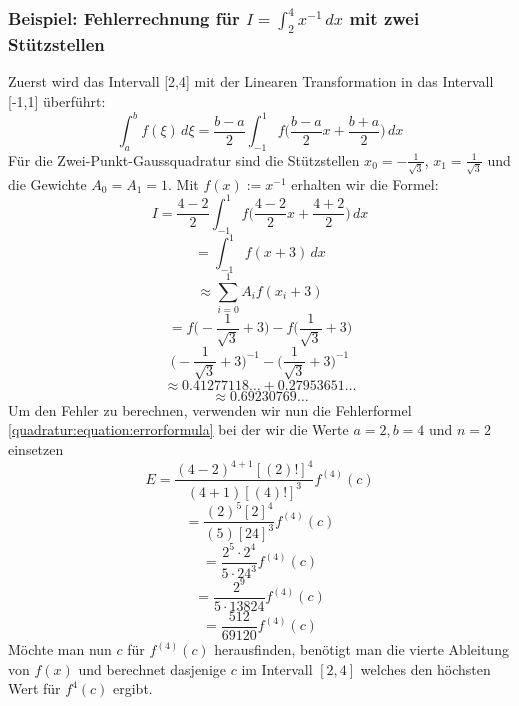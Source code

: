 \subsubsection{Beispiel: Fehlerrechnung für $I = \int_{2}^{4}x^{-1}\,dx$ mit zwei Stützstellen}
Zuerst wird das Intervall [2,4] mit der Linearen Transformation in das Intervall [-1,1] überführt:
\begin{equation}
    \int_{a}^{b} f(\xi)\,d\xi = \frac{b-a}{2}\int_{-1}^{1} f \bigg( \frac{b-a}{2} x + \frac{b+a}{2} \bigg) \,dx
\end{equation}
Für die Zwei-Punkt-Gaussquadratur sind die Stützstellen 
$x_{0}= -\frac{1}{\sqrt{3}}$, $x_{1} = \frac{1}{\sqrt{3}}$ 
und die Gewichte $A_{0} = A_{1} = 1$. Mit $f(x) := x^{-1}$ 
erhalten wir die Formel:
\begin{equation*}
    I = \frac{4-2}{2} \int_{-1}^{1} f \bigg( \frac{4-2}{2} x + \frac{4+2}{2} \bigg) \,dx
\end{equation*}
\begin{equation*}
    = \int_{-1}^{1} f (x + 3)\,dx 
\end{equation*}
\begin{equation*}
    \approx \sum_{i=0}^{1} A_{i} f(x_{i} + 3)
\end{equation*}
\begin{equation*}
    = f\bigg(-\frac{1}{\sqrt{3}}+3\bigg)
    -
    f\bigg(\frac{1}{\sqrt{3}}+3\bigg)
\end{equation*}
\begin{equation}
    \bigg(-\frac{1}{\sqrt{3}}+3\bigg)^{-1} 
    - 
    \bigg(\frac{1}{\sqrt{3}}+3\bigg)^{-1}
\end{equation}
\begin{equation*}
    \approx 0.41277118\dots + 0.27953651\dots
\end{equation*}
\begin{equation}
    \approx 0.69230769\dots
\end{equation}
Um den Fehler zu berechnen, verwenden wir nun die Fehlerformel \ref{quadratur:equation:errorformula}
bei der wir die Werte $a = 2, b = 4$ und $n = 2$ einsetzen
\begin{equation*}
    E = \frac{(4-2)^{4+1}[(2)!]^{4}}{(4+1)[(4)!]^{3}}f^{(4)}(c)
\end{equation*}
\begin{equation*}
    = \frac{(2)^{5}[2]^{4}}{(5)[24]^{3}}f^{(4)}(c)
\end{equation*}
\begin{equation*}
    = \frac{2^{5} \cdot 2^{4}}{5 \cdot 24^{3}}f^{(4)}(c)
\end{equation*}
\begin{equation*}
    = \frac{2^{9} }{5 \cdot 13824}f^{(4)}(c)
\end{equation*}
\begin{equation}
    = \frac{512}{69120}f^{(4)}(c)
\end{equation}
Möchte man nun $c$ für $f^{(4)}(c)$ herausfinden, benötigt man die 
vierte Ableitung von $f(x)$ und berechnet dasjenige $c$ im Intervall $[2, 4]$ 
welches den höchsten Wert für $f^{4}(c)$ ergibt.


